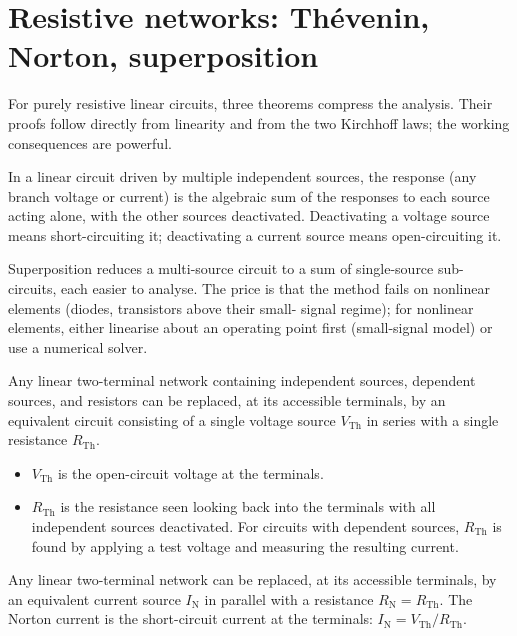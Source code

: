 \section{Resistive networks: Th\'evenin, Norton, superposition}

For purely resistive linear circuits, three theorems compress the
analysis. Their proofs follow directly from linearity and from the
two Kirchhoff laws; the working consequences are powerful.

\begin{theorem}[Superposition]
In a linear circuit driven by multiple independent sources, the
response (any branch voltage or current) is the algebraic sum of the
responses to each source acting alone, with the other sources
deactivated. Deactivating a voltage source means short-circuiting it;
deactivating a current source means open-circuiting it.
\end{theorem}

Superposition reduces a multi-source circuit to a sum of single-source
sub-circuits, each easier to analyse. The price is that the method
fails on nonlinear elements (diodes, transistors above their small-
signal regime); for nonlinear elements, either linearise about an
operating point first (small-signal model) or use a numerical solver.

\begin{theorem}[Th\'evenin]
Any linear two-terminal network containing independent sources,
dependent sources, and resistors can be replaced, at its accessible
terminals, by an equivalent circuit consisting of a single voltage
source $V_{\text{Th}}$ in series with a single resistance $R_{\text{Th}}$.
\begin{itemize}[leftmargin=*]
  \item $V_{\text{Th}}$ is the open-circuit voltage at the terminals.
  \item $R_{\text{Th}}$ is the resistance seen looking back into the
    terminals with all independent sources deactivated. For circuits
    with dependent sources, $R_{\text{Th}}$ is found by applying a
    test voltage and measuring the resulting current.
\end{itemize}
\end{theorem}

\begin{theorem}[Norton]
Any linear two-terminal network can be replaced, at its accessible
terminals, by an equivalent current source $I_{\text{N}}$ in parallel
with a resistance $R_{\text{N}} = R_{\text{Th}}$. The Norton current
is the short-circuit current at the terminals: $I_{\text{N}} =
V_{\text{Th}}/R_{\text{Th}}$.
\end{theorem}

